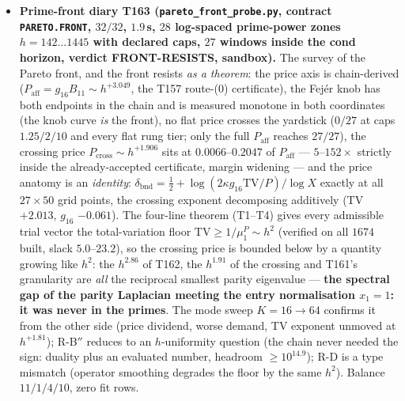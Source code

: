 \documentclass[11pt]{article}
\begin{document}
\begin{itemize}[leftmargin=1.5em]
$L=\sum_d\Psi_dw_d$ agrees on three routes per window: direct; double-Abel \emph{with}
the Wronskian boundary term ($2.8\times10^{-14}$; dropping it breaks by
$2.2\times10^{-4}$--$1.3\times10^{-2}$); the Lerch/Frullani integral with the $d=1$
term peeled closed ($1.8\times10^{-15}$) --- the peel constant $2\log2$ reproduced to
$2.2\times10^{-16}$ and $\Psi_1=-\log2$ exactly (Frullani 1828 / Lerch 1887 / Clausen
1832). Plus the monotone no-go staircase (damage $1.00\to3.49\to10.81\to24.98$ over
$\nu=4/2/1/0.5$, exact null control) and exact Dirichlet/parity controls.
\item \textbf{Prime-front diary T163 (\texttt{pareto\_front\_probe.py}, contract
\texttt{PARETO.FRONT}, $32/32$, $1.9$\,s, $28$ log-spaced prime-power zones
$h=142\ldots1445$ with declared caps, $27$ windows inside the cond horizon, verdict
FRONT-RESISTS, sandbox).} The survey of the Pareto front, and the front resists
\emph{as a theorem}: the price axis is chain-derived ($P_{\mathrm{aff}}=g_{16}B_{11}
\sim h^{+3.049}$, the T157 route-(0) certificate), the Fej\'er knob has both endpoints
in the chain and is measured monotone in both coordinates (the knob curve \emph{is}
the front), no flat price crosses the yardstick ($0/27$ at caps $1.25/2/10$ and every
flat rung tier; only the full $P_{\mathrm{aff}}$ reaches $27/27$), the crossing price
$P_{\mathrm{cross}}\sim h^{+1.906}$ sits at $0.0066$--$0.2047$ of $P_{\mathrm{aff}}$
--- $5$--$152\times$ strictly inside the already-accepted certificate, margin widening
--- and the price anatomy is an \emph{identity}:
$\delta_{\mathrm{bnd}}=\tfrac12+\log(2\kappa g_{16}\mathrm{TV}/P)/\log X$ exactly at
all $27\times50$ grid points, the crossing exponent decomposing additively (TV
$+2.013$, $g_{16}$ $-0.061$). The four-line theorem (T1--T4) gives every admissible
trial vector the total-variation floor $\mathrm{TV}\ge1/\mu^P_1\sim h^2$ (verified on
all $1674$ built, slack $5.0$--$23.2$), so the crossing price is bounded below by a
quantity growing like $h^2$: the $h^{2.86}$ of T162, the $h^{1.91}$ of the crossing
and T161's granularity are \emph{all} the reciprocal smallest parity eigenvalue ---
\textbf{the spectral gap of the parity Laplacian meeting the entry normalisation
$x_1=1$: it was never in the primes}. The mode sweep $K=16\to64$ confirms it from the
other side (price dividend, worse demand, TV exponent unmoved at $h^{+1.81}$); R-B$''$
reduces to an $h$-uniformity question (the chain never needed the sign: duality plus
an evaluated number, headroom $\ge10^{14.9}$); R-D is a type mismatch (operator
smoothing degrades the floor by the same $h^2$). Balance $11/1/4/10$, zero fit rows.

\end{itemize}
\end{document}
